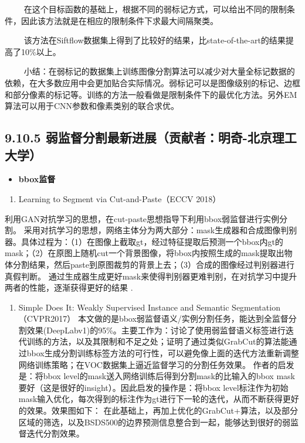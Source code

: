   
在这个目标函数的基础上，根据不同的弱标记方式，可以给出不同的限制条件，因此该方法就是在相应的限制条件下求最大间隔聚类。

\begin{figure}
\centering
\end{figure}

  
该方法在Siftflow数据集上得到了比较好的结果，比state-of-the-art的结果提高了10\%以上。

  
小结：在弱标记的数据集上训练图像分割算法可以减少对大量全标记数据的依赖，在大多数应用中会更加贴合实际情况。弱标记可以是图像级别的标记、边框和部分像素的标记等。训练的方法一般看做是限制条件下的最优化方法。另外EM算法可以用于CNN参数和像素类别的联合求优。

\subsection{9.10.5
弱监督分割最新进展（贡献者：明奇-北京理工大学）}\label{ux5f31ux76d1ux7763ux5206ux5272ux6700ux65b0ux8fdbux5c55ux8d21ux732eux8005ux660eux5947-ux5317ux4eacux7406ux5de5ux5927ux5b66}

\begin{itemize}
\item
  \textbf{bbox监督}
\end{itemize}

\begin{enumerate}
\def\labelenumi{\arabic{enumi}.}
\item
  Learning to Segment via Cut-and-Paste（ECCV 2018）
\end{enumerate}

利用GAN对抗学习的思想，在cut-paste思想指导下利用bbox弱监督进行实例分割。
采用对抗学习的思想，网络主体分为两大部分：mask生成器和合成图像判别器。具体过程为：（1）在图像上截取gt，经过特征提取后预测一个bbox内gt的mask；（2）在原图上随机cut一个背景图像，将bbox内按照生成的mask提取出物体分割结果，然后paste到原图裁剪的背景上去；（3）合成的图像经过判别器进行真假判断。
通过生成器生成更好mask来使得判别器更难判别，在对抗学习中提升两者的性能，逐渐获得更好的结果
.

\begin{enumerate}
\def\labelenumi{\arabic{enumi}.}
\setcounter{enumi}{1}
\item
  Simple Does It: Weakly Supervised Instance and Semantic
  Segmentation（CVPR2017）
  本文做的是bbox弱监督语义/实例分割任务，能达到全监督分割效果(DeepLabv1)的95\%。主要工作为：讨论了使用弱监督语义标签进行迭代训练的方法，以及其限制和不足之处；证明了通过类似GrabCut的算法能通过bbox生成分割训练标签方法的可行性，可以避免像上面的迭代方法重新调整网络训练策略；在VOC数据集上逼近监督学习的分割任务效果。
  作者的启发是：将bbox
  level的mask送入网络训练后得到分割mask的比输入的bbox
  mask要好（这是很好的insight）。因此启发的操作是：将bbox
  level标注作为初始mask输入优化，每次得到的标注作为gt进行下一轮的迭代，从而不断获得更好的效果。效果图如下：
  在此基础上，再加上优化的GrabCut+算法，以及部分区域的筛选，以及BSDS500的边界预测信息整合到一起，能够达到很好的弱监督迭代分割效果。
\end{enumerate}

